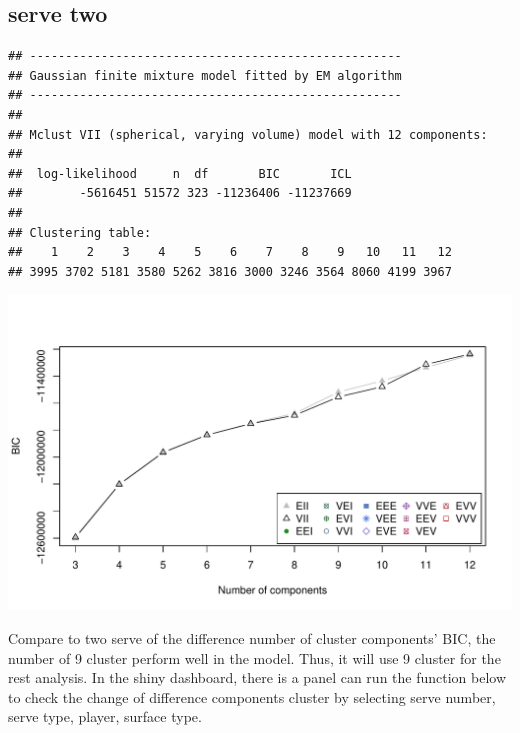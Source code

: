\documentclass[11pt,a4paper,]{article}
\begin{document}
\hypertarget{serve-two}{%
\subsection{serve two}\label{serve-two}}

\begin{verbatim}
## ---------------------------------------------------- 
## Gaussian finite mixture model fitted by EM algorithm 
## ---------------------------------------------------- 
## 
## Mclust VII (spherical, varying volume) model with 12 components: 
## 
##  log-likelihood     n  df       BIC       ICL
##        -5616451 51572 323 -11236406 -11237669
## 
## Clustering table:
##    1    2    3    4    5    6    7    8    9   10   11   12 
## 3995 3702 5181 3580 5262 3816 3000 3246 3564 8060 4199 3967
\end{verbatim}

\includegraphics{Report_files/figure-latex/unnamed-chunk-3-1.pdf}

Compare to two serve of the difference number of cluster components' BIC, the number of 9 cluster perform well in the model. Thus, it will use 9 cluster for the rest analysis. In the shiny dashboard, there is a panel can run the function below to check the change of difference components cluster by selecting serve number, serve type, player, surface type.
\end{document}
